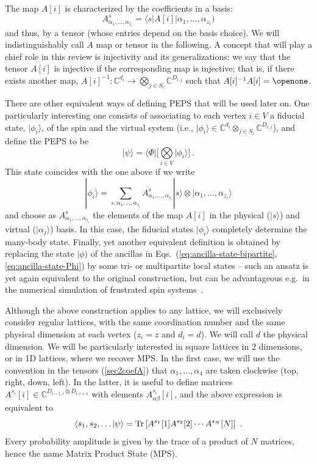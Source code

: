 \documentclass[rmp,aps,reprint,superscriptaddress,nobalancelastpage]{revtex4-1}
\newcommand{\be}{\begin{equation}}
\newcommand{\ee}{\end{equation}}
\newcommand{\ket}[1]{\vert#1\rangle}
\newcommand{\bra}[1]{\langle#1\vert}
\begin{document}
The map $A[i]$ is characterized by the coefficients in a basis:
\be\label{sec2coefA}
    A^s_{\alpha_1,\ldots,\alpha_{z_i}}=
    \bra{s}A[i]\vert\alpha_1,\ldots,\alpha_{z_i})
\ee
and thus, by a tensor (whose entries depend on the basis choice). We will indistinguishably call $A$ map or tensor in the following.  A concept that will play a chief role in this review is injectivity and its generalizations: we say that the tensor $A[i]$ is injective if the corresponding map is injective; that is, if there exists another map, $A[i]^{-1}:\mathbb{C}^{d_{i}} \to \bigotimes_{j\in S_i} \mathbb{C}^{D_{i,j}}$ such that $A[i]^{-1}A[i] = \openone$.


There are other equivalent ways of defining PEPS that will be used later on. One particularly interesting one consists of associating to each vertex $i\in V$ a fiducial state, $|\phi_i\rangle$, of the spin and the virtual system (i.e., $\ket{\phi_i}\in \mathbb{C}^{d_{i}} \otimes_{j\in S_i} \mathbb{C}^{D_{i,j}} $), and define the PEPS to be
\be
    |\psi\rangle = \langle \Phi| \Big[\textstyle\bigotimes\limits_{i\in V} |\phi_i\rangle\Big]\ .
\ee
This state coincides with the one above if we write
\be
    |\phi_i\rangle = \sum_{s,\alpha_1,\ldots,\alpha_{z_i}} A^s_{\alpha_1,\ldots,\alpha_{z_i}} |s\rangle\otimes |\alpha_1,\ldots,\alpha_{z_i}\rangle
\ee
and choose as $A^s_{\alpha_1,\ldots,\alpha_{z_i}}$ the elements of the map $A[i]$ in the physical ($|s\rangle$) and virtual ($|\alpha_{j}\rangle$) basis. In this case, the fiducial states $|\phi_i\rangle$ completely determine the many-body state.
Finally, yet another equivalent definition is obtained by replacing the state $|\phi)$ of the ancillas in Eqs.~(\ref{eq:ancilla-state-bipartite},\ref{eq:ancilla-state-Phi}) by some tri- or multipartite local states -- such an ansatz is yet again equivalent to the original construction, but can be advantageous e.g.\ in the numerical simulation of frustrated spin systems~\cite{xie:pess,schuch:rvb-kagome}.

Although the above construction applies to any lattice, we will exclusively consider regular lattices, with the same coordination number and the same physical dimension at each vertex ($z_i=z$ and $d_i=d$). We will call $d$ the physical dimension. We will be particularly interested in square lattices in 2 dimensions, or in 1D lattices, where we recover MPS. In the first case, we will use the convention in the tensors (\ref{sec2coefA}) that $\alpha_1,\ldots,\alpha_4$ are taken clockwise (top, right, down, left). In the latter, it is useful to define matrices $A^{s_i}[i] \in \mathbb{C}^{D_{i-1,i}\otimes D_{i,i+1}}$ with elements  $A^{s_i}_{\alpha\beta}[i]$, and the above expression is equivalent to
\be \label{eq:overlap-MPS-product}\langle s_1,s_2,\ldots |\psi\rangle={\rm Tr}\left[A^{s_1}[1]A^{s_2}[2]\cdots A^{s_N}[N]\right]
    \ .
\ee
Every probability amplitude is given by the trace of a product of $N$ matrices, hence the name Matrix Product State (MPS).
\end{document}
